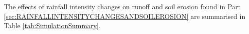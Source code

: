 % 

The effects of rainfall intensity changes on runoff and soil erosion found in
Part \ref{sec:RAINFALLINTENSITYCHANGESANDSOILEROSION} are summarised in Table
\ref{tab:SimulationSummary}.


